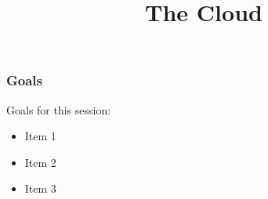 

\title[OpenStack \& Rackspace]{The Cloud}



\begin{frame}
\frametitle{Goals}

Goals for this session:
\begin{itemize}
\item Item 1
\item Item 2
\item Item 3
\end{itemize}

\end{frame}












